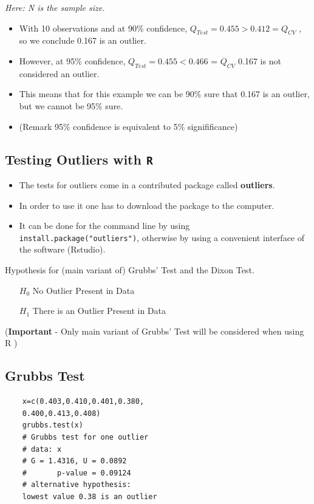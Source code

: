 \documentclass[a4paper,12pt]{article}
\begin{document}
\textit{Here: N is the sample size.}

\begin{itemize}
	\item	With 10 observations and at 90\% confidence, $Q_{Test} = 0.455 > 0.412 =Q_{CV}$ , so we conclude 0.167 is an outlier.
	\item  However, at 95\% confidence, $Q_{Test} = 0.455 < 0.466$ = $Q_{CV}$ 0.167 is not considered an outlier. 
	
	\item This means that for this example we can be 90\% sure that 0.167 is an outlier, but we cannot be 95\% sure.
	\bigskip
	\item (Remark 95\% confidence is equivalent to 5\% signifificance)
\end{itemize}	

\subsection{Testing Outliers with \texttt{R}}
\begin{itemize}
	\item The tests for outliers come in a contributed package called
	\textbf{outliers}.
	\item In order to use it one has to download the package to
	the computer. 
	\item It can be done for the command line by using
	\texttt{install.package("outliers")}, otherwise by using a
	convenient interface of the software (Rstudio).
\end{itemize}


Hypothesis for (main variant of) Grubbs' Test and the Dixon Test.

\begin{itemize}
	\item[$H_0$] No Outlier Present in Data
	\item[$H_1$] There is an Outlier Present in Data
\end{itemize}
\bigskip
(\textbf{Important} - Only main variant of Grubbs' Test will be considered when using R )
\subsection{Grubbs Test}
\begin{framed}
	\begin{verbatim}
	x=c(0.403,0.410,0.401,0.380,
	0.400,0.413,0.408)
	grubbs.test(x)
	# Grubbs test for one outlier
	# data: x
	# G = 1.4316, U = 0.0892
	#       p-value = 0.09124
	# alternative hypothesis: 
	lowest value 0.38 is an outlier
	\end{verbatim}
\end{framed}
\end{document}
